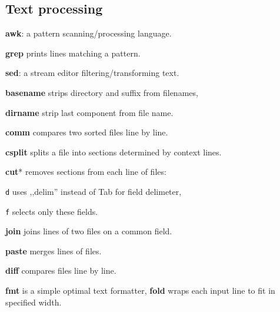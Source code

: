 \subsection*{Text processing}
\begin{enumx}
	\item [\cmd] \textbf{awk}: a pattern scanning/processing language.
	\item [\cmd] \textbf{grep} prints lines matching a pattern.
	\item [\cmd] \textbf{sed}: a stream editor filtering/transforming text.
\end{enumx}


\begin{enumx}
	\item [\cmd] \textbf{basename} strips directory and suffix from filenames, 
	\item [\cmd] \textbf{dirname} strip last component from file name.
\end{enumx}

\textbf{comm} compares two sorted files line by line.

\textbf{csplit} splits a file into sections determined by context lines.

\begin{enumx}
	\item [\cmd] \textbf{cut}* removes sections from each line of files:
	\item [\texttt{d}] uses ,,delim'' instead of Tab for field delimeter,
	\item [\texttt{f}] selects only these fields.
	\item [\cmd] \textbf{join} joins lines of two files on a common field.
	\item [\cmd] \textbf{paste} merges lines of files.
\end{enumx}

\begin{enumx}
	\item [\cmd] \textbf{diff} compares files line by line.
\end{enumx}


\textbf{fmt} is a simple optimal text formatter, 
\textbf{fold} wraps each input line to fit in specified width.


